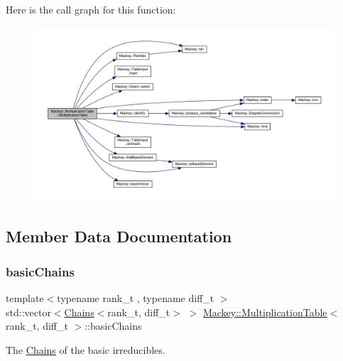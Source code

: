 Here is the call graph for this function\+:\nopagebreak
\begin{figure}[H]
\begin{center}
\leavevmode
\includegraphics[width=350pt]{classMackey_1_1MultiplicationTable_a8530e27d8d2c3c755eb5041a2ee8c35b_cgraph}
\end{center}
\end{figure}


\subsection{Member Data Documentation}
\mbox{\label{classMackey_1_1MultiplicationTable_ad135c8e904a71919c96437b444f4b1bb}} 
\subsubsection{\texorpdfstring{basic\+Chains}{basicChains}}
{\footnotesize\ttfamily template$<$typename rank\+\_\+t , typename diff\+\_\+t $>$ \\
std\+::vector$<$\hyperlink{classMackey_1_1Chains}{Chains}$<$rank\+\_\+t, diff\+\_\+t$>$ $>$ \hyperlink{classMackey_1_1MultiplicationTable}{Mackey\+::\+Multiplication\+Table}$<$ rank\+\_\+t, diff\+\_\+t $>$\+::basic\+Chains\hspace{0.3cm}{\ttfamily [protected]}}



The \hyperlink{classMackey_1_1Chains}{Chains} of the basic irreducibles. 

\mbox{\label{classMackey_1_1MultiplicationTable_af6896ea01c087e71533de423d7cf65ac}} 
